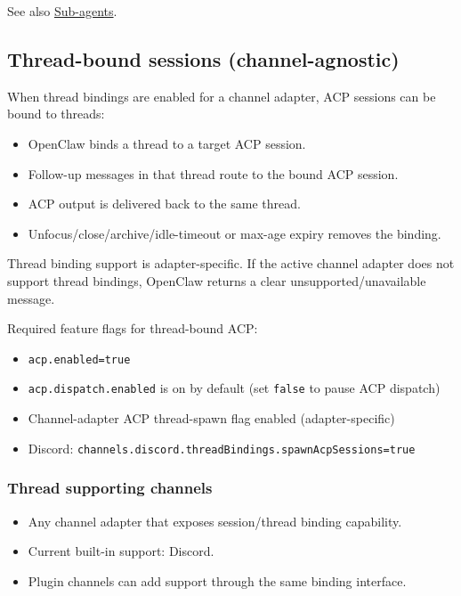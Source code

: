 See also \href{/tools/subagents}{Sub-agents}.

\subsection{Thread-bound sessions (channel-agnostic)}


When thread bindings are enabled for a channel adapter, ACP sessions can be bound to threads:

\begin{itemize}
  \item OpenClaw binds a thread to a target ACP session.
  \item Follow-up messages in that thread route to the bound ACP session.
  \item ACP output is delivered back to the same thread.
  \item Unfocus/close/archive/idle-timeout or max-age expiry removes the binding.
\end{itemize}


Thread binding support is adapter-specific. If the active channel adapter does not support thread bindings, OpenClaw returns a clear unsupported/unavailable message.

Required feature flags for thread-bound ACP:

\begin{itemize}
  \item \texttt{acp.enabled=true}
  \item \texttt{acp.dispatch.enabled} is on by default (set \texttt{false} to pause ACP dispatch)
  \item Channel-adapter ACP thread-spawn flag enabled (adapter-specific)
  \item Discord: \texttt{channels.discord.threadBindings.spawnAcpSessions=true}
\end{itemize}


\subsubsection{Thread supporting channels}


\begin{itemize}
  \item Any channel adapter that exposes session/thread binding capability.
  \item Current built-in support: Discord.
  \item Plugin channels can add support through the same binding interface.
\end{itemize}


